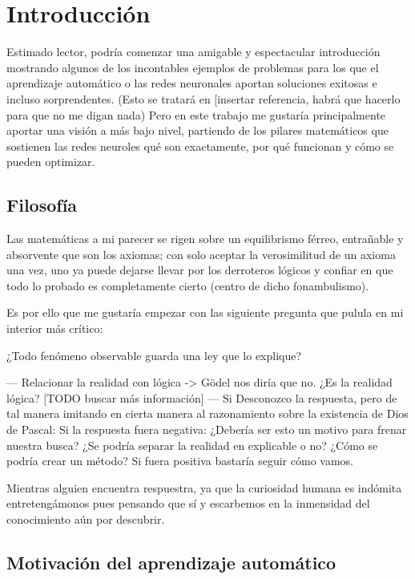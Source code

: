 
\chapter{Introducción}\label{ch:introduccion}

Estimado lector, podría comenzar una amigable y espectacular introducción mostrando algunos de los incontables ejemplos 
de problemas para los que 
el aprendizaje automático o las redes neuronales aportan soluciones exitosas e incluso sorprendentes. (Esto se tratará en 
[insertar referencia, habrá que hacerlo para que no me digan nada)
Pero en este trabajo me gustaría principalmente aportar una visión a más bajo nivel, partiendo de los pilares matemáticos 
que sostienen
las redes neuroles qué son exactamente, por qué funcionan y cómo se pueden optimizar. 

\section{Filosofía}
Las matemáticas a mi parecer se rigen sobre un equilibrismo férreo, entrañable y absorvente que son los axiomas;
con solo aceptar la verosimilitud de un axioma una vez, uno ya puede dejarse llevar por los derroteros
lógicos y confiar en que todo lo probado es completamente cierto (centro de dicho fonambulismo).   

Es por ello que me gustaría empezar con las siguiente pregunta que pulula en mi interior más crítico: 

¿Todo fenómeno observable guarda una ley que lo explique? 

---
Relacionar la realidad con lógica -> Gödel nos diría que no. 
¿Es la realidad lógica? 
[TODO buscar más información] 
---
Si 
Desconozco la respuesta, pero de tal manera imitando en cierta manera al razonamiento sobre la existencia
de Dios de Pascal: 
Si la respuesta fuera negativa: ¿Debería ser esto un motivo para frenar nuestra busca? 
¿Se podría separar la realidad en explicable o no? ¿Cómo se podría crear un método?
Si fuera positiva bastaría seguir cómo vamos. 

Mientras alguien encuentra respuestra, ya que la curiosidad humana es indómita
 entretengámonos pues pensando que sí y escarbemos en la inmensidad del conocimiento 
aún por descubrir. 

\section{Motivación del aprendizaje automático}



